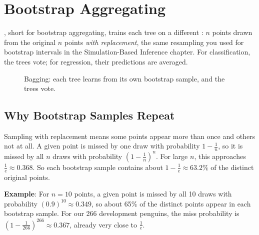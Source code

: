 \section{Bootstrap Aggregating}
, short for bootstrap aggregating, trains each tree on a different : $n$ points drawn from the original $n$ points \emph{with replacement}, the same
resampling you used for bootstrap intervals in the Simulation-Based Inference chapter. For classification, the
trees vote; for regression, their predictions are averaged.

\begin{figure}[H]
\centering
{}
\caption{Bagging: each tree learns from its own bootstrap sample, and the trees vote.}
\label{fig:bagging}
\end{figure}

\subsection{Why Bootstrap Samples Repeat}
Sampling with replacement means some points appear more than once and others not at all. A given point is missed
by one draw with probability $1 - \frac{1}{n}$, so it is missed by all $n$ draws with probability
$(1 - \frac{1}{n})^n$. For large $n$, this approaches $\frac{1}{e} \approx 0.368$. So each bootstrap sample
contains about $1 - \frac{1}{e} \approx 63.2\%$ of the distinct original points.

\textbf{Example}: For $n = 10$ points, a given point is missed by all 10 draws with probability
$(0.9)^{10} \approx 0.349$, so about 65\% of the distinct points appear in each bootstrap sample. For our 266
development penguins, the miss probability is $(1 - \frac{1}{266})^{266} \approx 0.367$, already very close to
$\frac{1}{e}$.


